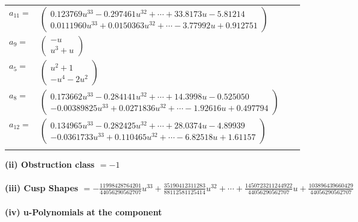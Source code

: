 \documentclass[1p]{elsarticle_modified}
\theoremstyle{definition}
\begin{document}
\begin{tabular}{m{7pt} m{180pt} m{7pt} m{180pt} }
\flushright $a_{11}=$&$\begin{pmatrix}0.123769 u^{33}-0.297461 u^{32}+\cdots+33.8173 u-5.81214\\0.0111960 u^{33}+0.0150363 u^{32}+\cdots-3.77992 u+0.912751\end{pmatrix}$ \\
\flushright $a_{9}=$&$\begin{pmatrix}- u\\u^3+u\end{pmatrix}$ \\
\flushright $a_{5}=$&$\begin{pmatrix}u^2+1\\- u^4-2 u^2\end{pmatrix}$ \\
\flushright $a_{8}=$&$\begin{pmatrix}0.173662 u^{33}-0.284141 u^{32}+\cdots+14.3998 u-0.525050\\-0.00389825 u^{33}+0.0271836 u^{32}+\cdots-1.92616 u+0.497794\end{pmatrix}$ \\
\flushright $a_{12}=$&$\begin{pmatrix}0.134965 u^{33}-0.282425 u^{32}+\cdots+28.0374 u-4.89939\\-0.0361733 u^{33}+0.110465 u^{32}+\cdots-6.82518 u+1.61157\end{pmatrix}$\\&\end{tabular}
\flushleft \textbf{(ii) Obstruction class $= -1$}\\~\\
\flushleft \textbf{(iii) Cusp Shapes $= -\frac{11998428764201}{44056290562707} u^{33}+\frac{35190412311283}{88112581125414} u^{32}+\cdots+\frac{1450723211244922}{44056290562707} u+\frac{103896439660429}{44056290562707}$}\\~\\
\newpage\renewcommand{\arraystretch}{1}
\flushleft \textbf{(iv) u-Polynomials at the component}\newline \\
\end{document}

